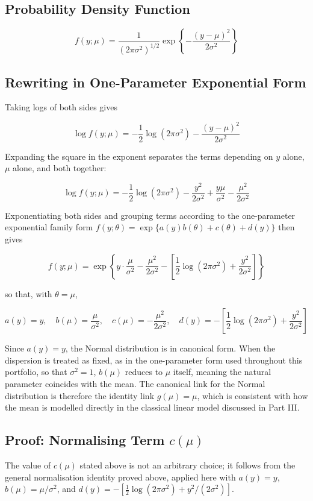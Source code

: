 \subsection*{Probability Density Function}
\begin{mathbox}
\[
f(y;\mu) = \frac{1}{(2\pi\sigma^2)^{1/2}}\exp\left\{-\frac{(y-\mu)^2}{2\sigma^2}\right\}
\]
\end{mathbox}

\subsection*{Rewriting in One-Parameter Exponential Form}
Taking logs of both sides gives
\begin{mathbox}
\[
\log f(y;\mu) = -\frac{1}{2}\log(2\pi\sigma^2) - \frac{(y-\mu)^2}{2\sigma^2}
\]
\end{mathbox}
Expanding the square in the exponent separates the terms depending on $y$ alone, $\mu$ alone, and both together:
\begin{mathbox}
\[
\log f(y;\mu) = -\frac{1}{2}\log(2\pi\sigma^2) - \frac{y^2}{2\sigma^2} + \frac{y\mu}{\sigma^2} - \frac{\mu^2}{2\sigma^2}
\]
\end{mathbox}
Exponentiating both sides and grouping terms according to the one-parameter exponential family form $f(y;\theta)=\exp\{a(y)b(\theta)+c(\theta)+d(y)\}$ then gives
\begin{mathbox}
\[
f(y;\mu) = \exp\left\{y\cdot\frac{\mu}{\sigma^2} - \frac{\mu^2}{2\sigma^2} - \left[\frac{1}{2}\log(2\pi\sigma^2)+\frac{y^2}{2\sigma^2}\right]\right\}
\]
\end{mathbox}
so that, with $\theta=\mu$,
\begin{mathbox}
\[
a(y)=y,\quad b(\mu)=\frac{\mu}{\sigma^2},\quad c(\mu)=-\frac{\mu^2}{2\sigma^2},\quad d(y)=-\left[\frac{1}{2}\log(2\pi\sigma^2)+\frac{y^2}{2\sigma^2}\right]
\]
\end{mathbox}
Since $a(y)=y$, the Normal distribution is in canonical form. When the dispersion is treated as fixed, as in the one-parameter form used throughout this portfolio, so that $\sigma^2=1$, $b(\mu)$ reduces to $\mu$ itself, meaning the natural parameter coincides with the mean. The canonical link for the Normal distribution is therefore the identity link $g(\mu)=\mu$, which is consistent with how the mean is modelled directly in the classical linear model discussed in Part III.

\subsection*{Proof: Normalising Term $c(\mu)$}
The value of $c(\mu)$ stated above is not an arbitrary choice; it follows from the general normalisation identity proved above, applied here with $a(y)=y$, $b(\mu)=\mu/\sigma^2$, and $d(y)=-\left[\frac{1}{2}\log(2\pi\sigma^2)+y^2/(2\sigma^2)\right]$.

